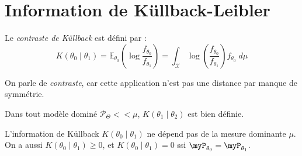 
\section{Information de Küllback-Leibler}

\begin{definition}
    Le \emph{contraste de Küllback} est défini par : 
    \begin{equation}
        K( \theta_0 \mid \theta_1) = \mathbb{E}_{\theta_0} \left(\log \frac{f_{\theta_0}}{f_{\theta_1}} \right) = 
        \int_\mathcal{X} \log \left( \frac{f_{\theta_0}}{f_{\theta_1}}\right) f_{\theta_0} \; d \mu 
    \end{equation}
\end{definition}

On parle de \emph{contraste}, car cette application n'est pas une distance par manque de symmétrie. 

\begin{prop}
    Dans tout modèle dominé $ \mathcal{P}_\Theta << \mu$, $K( \theta_1 \mid \theta_2)$ est bien définie. 
\end{prop}

\begin{proposition}
    L'information de Küllback $ K( \theta_0 \mid \theta_1)$ ne dépend pas de la mesure dominante $ \mu$. 
    On a aussi $ K( \theta_0 \mid \theta_1) \geqslant 0$, et $ K( \theta_0 \mid \theta_1) = 0$ ssi 
    $ \myP_{\theta_0} = \myP_{\theta_1}$. 
\end{proposition}






